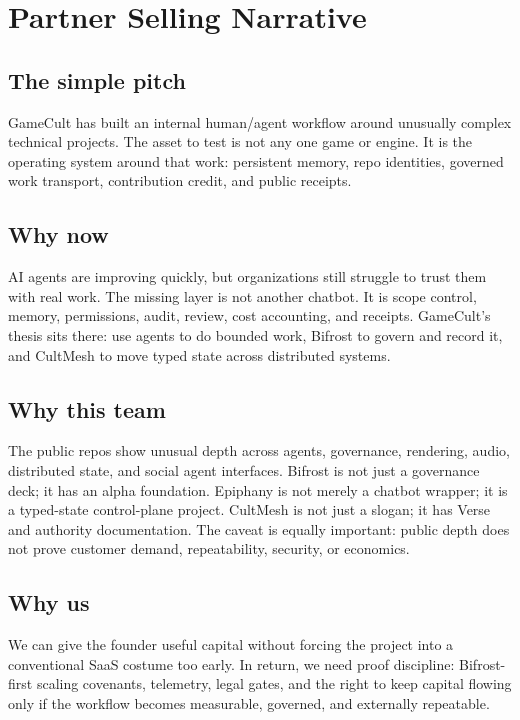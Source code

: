 \documentclass[11pt,oneside]{report}
\begin{document}
\chapter{Partner Selling Narrative}

\section{The simple pitch}

GameCult has built an internal human/agent workflow around unusually complex technical projects. The asset to test is not any one game or engine. It is the operating system around that work: persistent memory, repo identities, governed work transport, contribution credit, and public receipts.

\section{Why now}

AI agents are improving quickly, but organizations still struggle to trust them with real work. The missing layer is not another chatbot. It is scope control, memory, permissions, audit, review, cost accounting, and receipts. GameCult's thesis sits there: use agents to do bounded work, Bifrost to govern and record it, and CultMesh to move typed state across distributed systems.

\section{Why this team}

The public repos show unusual depth across agents, governance, rendering, audio, distributed state, and social agent interfaces. Bifrost is not just a governance deck; it has an alpha foundation. Epiphany is not merely a chatbot wrapper; it is a typed-state control-plane project. CultMesh is not just a slogan; it has Verse and authority documentation. The caveat is equally important: public depth does not prove customer demand, repeatability, security, or economics.

\section{Why us}

We can give the founder useful capital without forcing the project into a conventional SaaS costume too early. In return, we need proof discipline: Bifrost-first scaling covenants, telemetry, legal gates, and the right to keep capital flowing only if the workflow becomes measurable, governed, and externally repeatable.
\end{document}
